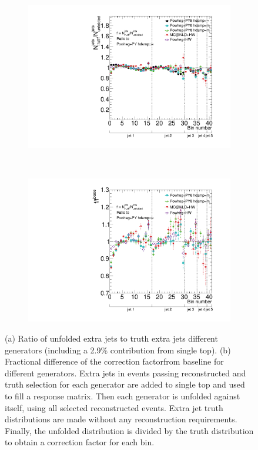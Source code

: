\begin{center}
\begin{figure}
\begin{subfigure}[]{0.45\textwidth}
\includegraphics[width=\textwidth]{fig/Unfolding/CorrFactors.pdf}
\end{subfigure}
~
\begin{subfigure}[]{0.45\textwidth}
\includegraphics[width=\textwidth]{fig/Unfolding/RatioCorrection.pdf}
\end{subfigure}
\caption{(a) Ratio of unfolded extra jets to truth extra jets different \ttbar generators (including a 2.9\% contribution from single top). (b) Fractional difference of the correction factorfrom baseline for different generators. Extra jets in events passing reconstructed and truth selection for each generator are added to single top and used to fill a response matrix. Then each generator is unfolded against itself, using all selected reconstructed events. Extra jet truth distributions are made without any reconstruction requirements. Finally, the unfolded distribution is divided by the truth distribution to obtain a correction factor for each bin.
\label{fig:bincorr}}
\end{figure}
\end{center}




